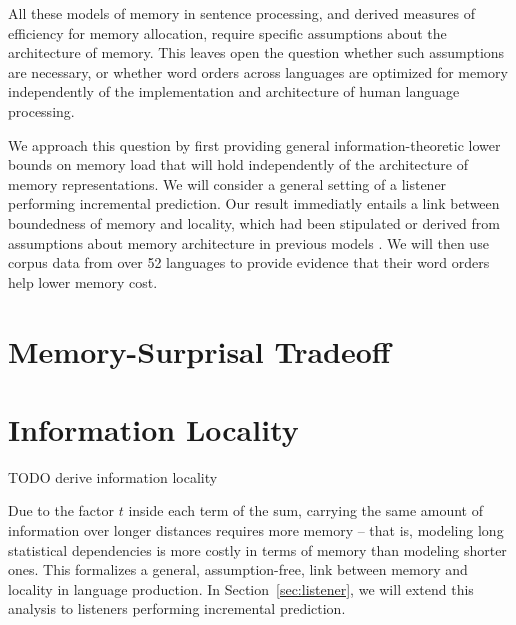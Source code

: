 \documentclass[11pt,letterpaper]{article}
\begin{document}
All these models of memory in sentence processing, and derived measures of efficiency for memory allocation, require specific assumptions about the architecture of memory.
This leaves open the question whether such assumptions are necessary, or whether word orders across languages are optimized for memory independently of the implementation and architecture of human language processing.


We approach this question by first providing general information-theoretic lower bounds on memory load that will hold independently of the architecture of memory representations.
We will consider a general setting of a listener performing incremental prediction.
Our result immediatly entails a link between boundedness of memory and locality, which had been stipulated or derived from assumptions about memory architecture in previous models \citep{gibson-linguistic-1998, lewis-activation-based-2005, futrell-noisy-context-2017}.
We will then use corpus data from over 52 languages to provide evidence that their word orders help lower memory cost.

%
%
%
%
%







\section{Memory-Surprisal Tradeoff}
\label{sec:ms-tradeoff}




\section{Information Locality}\label{sec:info-locality}

TODO derive information locality

Due to the factor $t$ inside each term of the sum, carrying the same amount of information over longer distances requires more memory -- that is, modeling long statistical dependencies is more costly in terms of memory than modeling shorter ones.
This formalizes a general, assumption-free, link between memory and locality in language production.
In Section~\ref{sec:listener}, we will extend this analysis to listeners performing incremental prediction.
\end{document}
